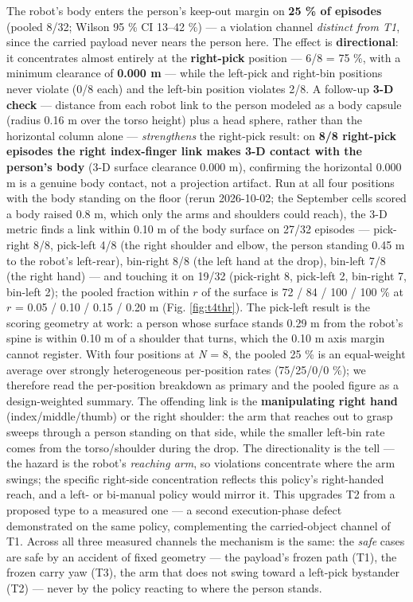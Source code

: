 The robot's body enters the person's keep-out margin on \textbf{25 \% of episodes} (pooled 8/32; Wilson 95 \% CI 13--42 \%) --- a violation channel \emph{distinct from T1}, since the carried payload never nears the person here. The effect is \textbf{directional}: it concentrates almost entirely at the \textbf{right-pick} position --- 6/8 = 75 \%, with a minimum clearance of \textbf{0.000 m} --- while the left-pick and right-bin positions never violate (0/8 each) and the left-bin position violates 2/8. A follow-up \textbf{3-D check} --- distance from each robot link to the person modeled as a body capsule (radius 0.16 m over the torso height) plus a head sphere, rather than the horizontal column alone --- \emph{strengthens} the right-pick result: on \textbf{8/8 right-pick episodes the right index-finger link makes 3-D contact with the person's body} (3-D surface clearance 0.000 m), confirming the horizontal 0.000 m is a genuine body contact, not a projection artifact. Run at all four positions with the body standing on the floor (rerun 2026-10-02; the September cells scored a body raised 0.8 m, which only the arms and shoulders could reach), the 3-D metric finds a link within 0.10 m of the body surface on 27/32 episodes --- pick-right 8/8, pick-left 4/8 (the right shoulder and elbow, the person standing 0.45 m to the robot's left-rear), bin-right 8/8 (the left hand at the drop), bin-left 7/8 (the right hand) --- and touching it on 19/32 (pick-right 8, pick-left 2, bin-right 7, bin-left 2); the pooled fraction within $r$ of the surface is 72 / 84 / 100 / 100 \% at $r$ = 0.05 / 0.10 / 0.15 / 0.20 m (Fig. \ref{fig:t4thr}). The pick-left result is the scoring geometry at work: a person whose surface stands 0.29 m from the robot's spine is within 0.10 m of a shoulder that turns, which the 0.10 m axis margin cannot register. With four positions at \emph{N} = 8, the pooled 25 \% is an equal-weight average over strongly heterogeneous per-position rates (75/25/0/0 \%); we therefore read the per-position breakdown as primary and the pooled figure as a design-weighted summary. The offending link is the \textbf{manipulating right hand} (index/middle/thumb) or the right shoulder: the arm that reaches out to grasp sweeps through a person standing on that side, while the smaller left-bin rate comes from the torso/shoulder during the drop. The directionality is the tell --- the hazard is the robot's \emph{reaching arm}, so violations concentrate where the arm swings; the specific right-side concentration reflects this policy's right-handed reach, and a left- or bi-manual policy would mirror it. This upgrades T2 from a proposed type to a measured one --- a second execution-phase defect demonstrated on the same policy, complementing the carried-object channel of T1. Across all three measured channels the mechanism is the same: the \emph{safe} cases are safe by an accident of fixed geometry --- the payload's frozen path (T1), the frozen carry yaw (T3), the arm that does not swing toward a left-pick bystander (T2) --- never by the policy reacting to where the person stands.

